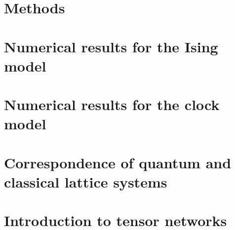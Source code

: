 \documentclass[9pt, ebook, openany, oneside]{memoir}
\begin{document}
\chapter{Methods}

\chapter{Numerical results for the Ising model}


\chapter{Numerical results for the clock model}


\appendix
\chapter{Correspondence of quantum and classical lattice
systems}\label{chapter:correspondence_quantum_classical}


\chapter{Introduction to tensor networks}\label{chapter:introduction_to_tensor_networks}


% 


\backmatter
\printbibliography
\end{document}
